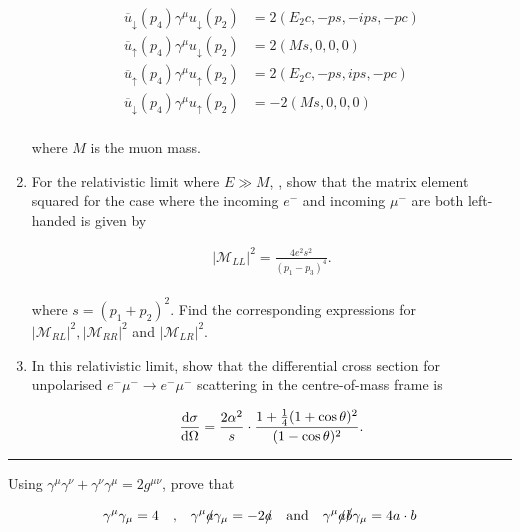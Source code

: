 \begin{problem}{6.7}
\begin{enumerate}[label=(\alph*)]
        \begin{align*}
            \overbar{u}_\downarrow(p_4)\gamma^\mu u_\downarrow(p_2) &= 2 (E_2 c , -ps,-ips, -pc) \\
            \overbar{u}_\uparrow(p_4)\gamma^\mu u_\downarrow(p_2)   &= 2 (Ms,0,0,0) \\
            \overbar{u}_\uparrow(p_4)\gamma^\mu u_\uparrow(p_2) &= 2 (E_2 c, -ps ,ips,-pc) \\
            \overbar{u}_\downarrow(p_4)\gamma^\mu u_\uparrow(p_2) &= -2 (Ms,0,0,0)
        \end{align*}\\
        where $M$ is the muon mass.

        \item For the relativistic limit where $E\gg M$, , show that the matrix element squared for the case where the incoming $e^-$ and incoming $\mu^-$ are both left-handed is given by
        
        \begin{align*}
            |\mathcal{M}_{LL}|^2 = \frac{4e^2s^2}{(p_1-p_3)^4}.
        \end{align*}\\
        where $s=(p_1+p_2)^2$. Find the corresponding expressions for $|\mathcal{M}_{RL}|^2,|\mathcal{M}_{RR}|^2$ and $|\mathcal{M}_{LR}|^2$.

        \item In this relativistic limit, show that the differential cross section for unpolarised $e^-\mu^- \to e^-\mu^-$ scattering in the centre-of-mass frame is
        
        \begin{align*}
            \frac{\mathop{}\!\mathrm{d}\sigma}{\mathop{}\!\mathrm{d}\Omega} = \frac{2\alpha^2}{s} \cdot \frac{1+\frac{1}{4}(1+\cos\theta)^2}{(1-\cos\theta)^2}.\\
        \end{align*}
        
    \end{enumerate}
\end{problem}
\begin{solution}

\end{solution}

\noindent\rule{7in}{1.5pt}


\begin{problem}{6.8}
    Using $\gamma^\mu\gamma^\nu + \gamma^\nu\gamma^\mu = 2g^{\mu\nu}$, prove that 

    \begin{align*}
        \gamma^\mu\gamma_\mu =4 \quad \text{,} \quad \gamma^\mu \slashed{a}  \gamma_\mu = - 2 \slashed{a} \quad \text{and} \quad \gamma^\mu \slashed{a} \slashed{b} \gamma_\mu = 4 a\cdot b \\
    \end{align*}
\end{problem}
\begin{solution}

\end{solution}

